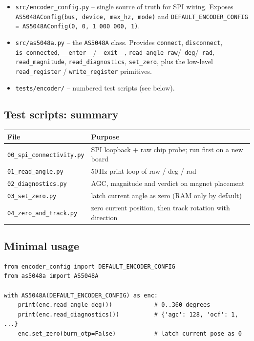 \documentclass[11pt,a4paper]{article}
\begin{document}
\begin{itemize}
  \item \texttt{src/encoder\_config.py} -- single source of truth for SPI
        wiring.  Exposes \texttt{AS5048AConfig(bus, device, max\_hz, mode)}
        and \texttt{DEFAULT\_ENCODER\_CONFIG = AS5048AConfig(0, 0,
        1\,000\,000, 1)}.
  \item \texttt{src/as5048a.py} -- the \texttt{AS5048A} class.  Provides
        \texttt{connect}, \texttt{disconnect}, \texttt{is\_connected},
        \texttt{\_\_enter\_\_}/\texttt{\_\_exit\_\_},
        \texttt{read\_angle\_raw}/\texttt{\_deg}/\texttt{\_rad},
        \texttt{read\_magnitude}, \texttt{read\_diagnostics},
        \texttt{set\_zero}, plus the low-level \texttt{read\_register} /
        \texttt{write\_register} primitives.
  \item \texttt{tests/encoder/} -- numbered test scripts (see below).
\end{itemize}

\subsection{Test scripts: summary}
\begin{center}\small
\begin{tabular}{ll}
\toprule
File & Purpose\\
\midrule
\texttt{00\_spi\_connectivity.py} & SPI loopback + raw chip probe; run first on a new board\\
\texttt{01\_read\_angle.py}       & 50\,Hz print loop of raw / deg / rad\\
\texttt{02\_diagnostics.py}       & AGC, magnitude and verdict on magnet placement\\
\texttt{03\_set\_zero.py}         & latch current angle as zero (RAM only by default)\\
\texttt{04\_zero\_and\_track.py}  & zero current position, then track rotation with direction\\
\bottomrule
\end{tabular}
\end{center}

\subsection{Minimal usage}
\begin{lstlisting}
from encoder_config import DEFAULT_ENCODER_CONFIG
from as5048a import AS5048A

with AS5048A(DEFAULT_ENCODER_CONFIG) as enc:
    print(enc.read_angle_deg())            # 0..360 degrees
    print(enc.read_diagnostics())          # {'agc': 128, 'ocf': 1, ...}
    enc.set_zero(burn_otp=False)           # latch current pose as 0
\end{lstlisting}
\end{document}
